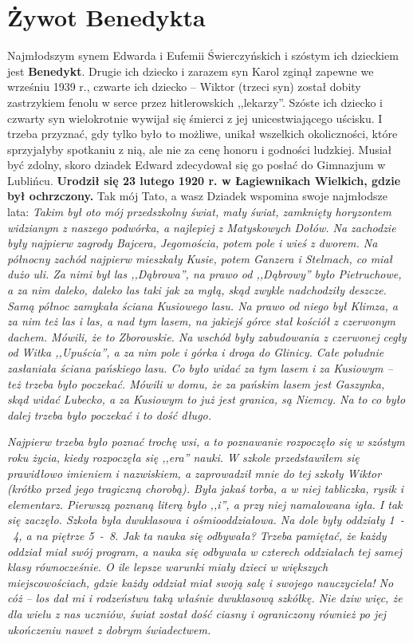 \section{Żywot Benedykta}

Najmłodszym synem Edwarda i Eufemii Świerczyńskich i szóstym ich dzieckiem jest \textbf{Benedykt}. Drugie ich dziecko i zarazem syn Karol zginął zapewne we wrześniu 1939 r., czwarte ich dziecko -- Wiktor (trzeci syn) został dobity zastrzykiem fenolu w serce przez hitlerowskich ,,lekarzy''. Szóste ich dziecko i czwarty syn wielokrotnie wywijał się śmierci z jej unicestwiającego uścisku. I trzeba przyznać, gdy tylko było to możliwe, unikał wszelkich okoliczności, które sprzyjałyby spotkaniu z nią, ale nie za cenę honoru i godności ludzkiej. Musiał być zdolny, skoro dziadek Edward zdecydował się go posłać do Gimnazjum w Lublińcu.\textbf{ Urodził się 23 lutego 1920 r. w Łagiewnikach Wielkich, gdzie był ochrzczony.} Tak mój Tato, a wasz Dziadek wspomina swoje najmłodsze lata: \textit{Takim był oto mój przedszkolny świat, mały świat, zamknięty horyzontem widzianym z naszego podwórka, a najlepiej z Matyskowych Dołów. Na zachodzie były najpierw zagrody Bajcera, Jegomościa, potem pole i wieś z dworem. Na północny zachód najpierw mieszkały Kusie, potem Ganzera i Stelmach, co miał dużo uli. Za nimi był las ,,Dąbrowa'', na prawo od ,,Dąbrowy'' było Pietruchowe, a za nim daleko, daleko las taki jak za mgłą, skąd zwykle nadchodziły deszcze. Samą północ zamykała ściana Kusiowego lasu. Na prawo od niego był Klimza, a za nim też las i las, a nad tym lasem, na jakiejś górce stał kościół z czerwonym dachem. Mówili, że to Zborowskie. Na wschód były zabudowania z czerwonej cegły od Witka ,,Upuścia'', a za nim pole i górka i droga do Glinicy. Całe południe zasłaniała ściana pańskiego lasu. Co było widać za tym lasem i za Kusiowym – też trzeba było poczekać. Mówili w domu, że za pańskim lasem jest Gaszynka, skąd widać Lubecko, a za Kusiowym to już jest granica, są Niemcy. Na to co było dalej trzeba było poczekać i to dość długo.}

\textit{Najpierw trzeba było poznać trochę wsi, a to poznawanie rozpoczęło się w szóstym roku życia, kiedy rozpoczęła się ,,era'' nauki. W szkole przedstawiłem się prawidłowo imieniem i nazwiskiem, a zaprowadził mnie do tej szkoły Wiktor (krótko przed jego tragiczną chorobą). Była jakaś torba, a w niej tabliczka, rysik i elementarz. Pierwszą poznaną literą było ,,i'', a przy niej namalowana igła. I tak się zaczęło. Szkoła była dwuklasowa i ośmiooddziałowa. Na dole były oddziały 1~-~4, a na piętrze 5~-~8. Jak ta nauka się odbywała? Trzeba pamiętać, że każdy oddział miał swój program, a nauka się odbywała w czterech oddziałach tej samej klasy równocześnie. O ile lepsze warunki miały dzieci w większych miejscowościach, gdzie każdy oddział miał swoją salę i swojego nauczyciela! No cóż – los dał mi i rodzeństwu taką właśnie dwuklasową szkółkę. Nie dziw więc, że dla wielu z nas uczniów, świat został dość ciasny i ograniczony również po jej ukończeniu nawet z dobrym świadectwem.}

